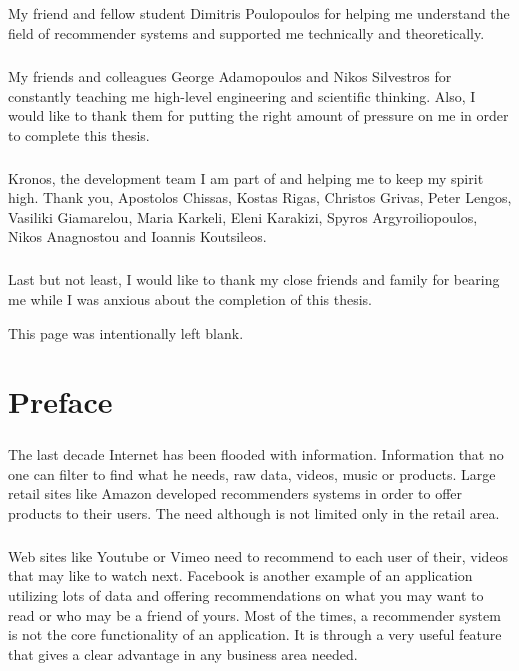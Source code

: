 \documentclass[10pt, a4paper, oneside]{journal}
\begin{document}
	\paragraph{} My friend and fellow student Dimitris Poulopoulos for helping me understand the field of recommender systems and supported me technically and theoretically.
	
	\paragraph{} My friends and colleagues George Adamopoulos and Nikos Silvestros for constantly teaching me high-level engineering and scientific thinking. Also, I would like to thank them for putting the right amount of pressure on me in order to complete this thesis.
	
	\paragraph{} Kronos, the development team I am part of and helping me to keep my spirit high. Thank you, Apostolos Chissas, Kostas Rigas, Christos Grivas, Peter Lengos, Vasiliki Giamarelou, Maria Karkeli, Eleni Karakizi, Spyros Argyroiliopoulos, Nikos Anagnostou and Ioannis Koutsileos. 
	
	\paragraph{} Last but not least, I would like to thank my close friends and family for bearing me while I was anxious about the completion of this thesis.
	
	\newpage
	\begin{center}
		This page was intentionally left blank.
	\end{center}
	\newpage
	\chapter{Preface}
	\paragraph{} The last decade Internet has been flooded with information. Information that no one can filter to find what he needs, raw data, videos, music or products. Large retail sites like Amazon developed recommenders systems in order to offer products to their users. The need although is not limited only in the retail area. 
	\paragraph{}Web sites like Youtube or Vimeo need to recommend to each user of their, videos that may like to watch next. Facebook is another example of an application utilizing lots of data and offering recommendations on what you may want to read or who may be a friend of yours. Most of the times, a recommender system is not the core functionality of an application. It is through a very useful feature that gives a clear advantage in any business area needed.
	
\end{document}
